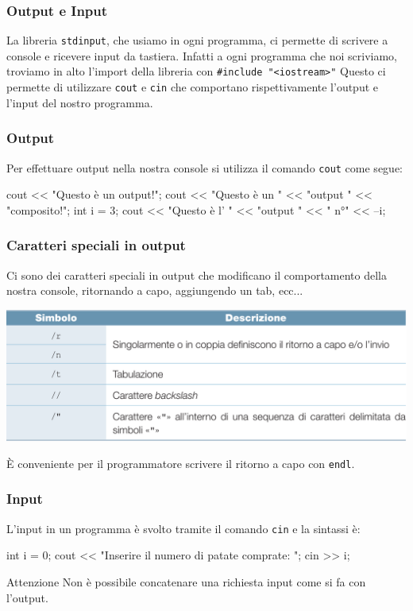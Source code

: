 \documentclass{beamer}
\begin{document}
    \begin{frame}[fragile]
        \frametitle{Output e Input}
        La libreria \texttt{stdinput}, che usiamo in ogni programma, ci permette di scrivere a console e ricevere input da tastiera. Infatti a ogni programma che noi scriviamo, troviamo in alto l'import della libreria con \texttt{#include "<iostream>"}
        Questo ci permette di utilizzare \texttt{cout} e \texttt{cin} che comportano rispettivamente l'output e l'input del nostro programma.
    \end{frame}

    \begin{frame}[fragile]
        \frametitle{Output}
        Per effettuare output nella nostra console si utilizza il comando \texttt{cout} come segue:
        \begin{cppcode}
            cout << "Questo è un output!";
            cout << "Questo è un " << "output " << "composito!";
            int i = 3;
            cout << "Questo è l' " << "output " << " n°" << --i;
        \end{cppcode}
    \end{frame}

    \begin{frame}[fragile]
        \frametitle{Caratteri speciali in output}
        Ci sono dei caratteri speciali in output che modificano il comportamento della nostra console, ritornando a capo, aggiungendo un tab, ecc... \\
        \begin{center}
            \includegraphics[scale=0.3]{img/escape_sequences.png}
        \end{center}
        È conveniente per il programmatore scrivere il ritorno a capo con \texttt{endl}.
    \end{frame}

    \begin{frame}[fragile]
        \frametitle{Input}
        L'input in un programma è svolto tramite il comando \texttt{cin} e la sintassi è:
        \begin{cppcode}
            int i = 0;
            cout << "Inserire il numero di patate comprate: ";
            cin >> i;
        \end{cppcode}
        \begin{block}{Attenzione}
            Non è possibile concatenare una richiesta input come si fa con l'output.
        \end{block}
    \end{frame}
\end{document}
